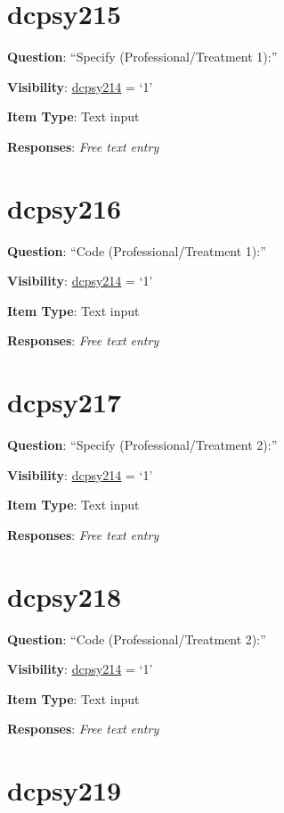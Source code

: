 \documentclass[]{book}
\begin{document}
\hypertarget{dcpsy215}{%
\section{dcpsy215}\label{dcpsy215}}

\textbf{Question}: ``Specify (Professional/Treatment 1):''

\textbf{Visibility}: \protect\hyperlink{dcpsy214}{dcpsy214} = `1'

\textbf{Item Type}: Text input

\textbf{Responses}: \emph{Free text entry}

\hypertarget{dcpsy216}{%
\section{dcpsy216}\label{dcpsy216}}

\textbf{Question}: ``Code (Professional/Treatment 1):''

\textbf{Visibility}: \protect\hyperlink{dcpsy214}{dcpsy214} = `1'

\textbf{Item Type}: Text input

\textbf{Responses}: \emph{Free text entry}

\hypertarget{dcpsy217}{%
\section{dcpsy217}\label{dcpsy217}}

\textbf{Question}: ``Specify (Professional/Treatment 2):''

\textbf{Visibility}: \protect\hyperlink{dcpsy214}{dcpsy214} = `1'

\textbf{Item Type}: Text input

\textbf{Responses}: \emph{Free text entry}

\hypertarget{dcpsy218}{%
\section{dcpsy218}\label{dcpsy218}}

\textbf{Question}: ``Code (Professional/Treatment 2):''

\textbf{Visibility}: \protect\hyperlink{dcpsy214}{dcpsy214} = `1'

\textbf{Item Type}: Text input

\textbf{Responses}: \emph{Free text entry}

\hypertarget{dcpsy219}{%
\section{dcpsy219}\label{dcpsy219}}
\end{document}
